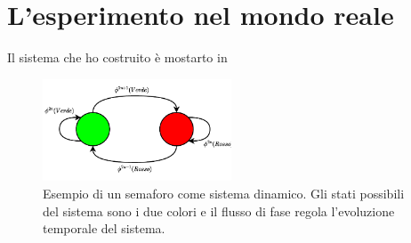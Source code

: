 \section{L'esperimento nel mondo reale}
\label{sec:sistema-reale}
Il sistema che ho costruito è mostarto in 

\begin{figure}[H]
    \centering
    \includegraphics[width=0.5\textwidth]{assets/ex-semaforo}
    \caption[Semaforo]{Esempio di un semaforo come sistema dinamico.
    Gli stati possibili del sistema sono i due colori e il flusso di fase
    regola l'evoluzione temporale del sistema.}
    \label{fig:esempio-semaforo}
\end{figure}

